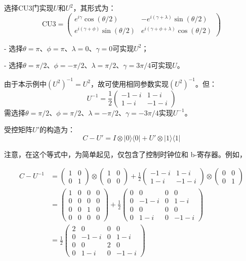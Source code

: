 \documentclass{article}
\begin{document}
选择CU3门实现\(U\)和\(U^2\)，其形式为：
\[
\text{CU3} = \begin{pmatrix} e^{i\gamma}\cos(\theta/2) & -e^{i(\gamma+\lambda)}\sin(\theta/2) \\ e^{i(\gamma+\phi)}\sin(\theta/2) & e^{i(\gamma+\phi+\lambda)}\cos(\theta/2) \end{pmatrix}
\]

- 选择\(\theta = \pi\)、\(\phi = \pi\)、\(\lambda = 0\)、\(\gamma = 0\)可实现\(U^2\)；

- 选择\(\theta = \pi/2\)、\(\phi = -\pi/2\)、\(\lambda = \pi/2\)、\(\gamma = 3\pi/4\)可实现\(U\)。

由于本示例中\({(U^2)}^{-1} = U^2\)，故可使用相同参数实现\({(U^2)}^{-1}\)。但：
\[
U^{-1} = \frac{1}{2} \begin{pmatrix} -1-i & 1-i \\ 1-i & -1-i \end{pmatrix}
\]
需选择\(\theta = \pi/2\)、\(\phi = \pi/2\)、\(\lambda = -\pi/2\)、\(\gamma = -3\pi/4\)实现\(U^{-1}\)。

受控矩阵\(U'\)的构造为：
\[
C-U' = I \otimes |0\rangle\langle0| + U' \otimes |1\rangle\langle1|
\]

注意，在这个等式中，为简单起见，仅包含了控制时钟位和 b-寄存器。例如，

\[
\begin{aligned} 
C - U^{-1} &= \begin{pmatrix} 1 & 0 \\ 0 & 1 \end{pmatrix} \otimes \begin{pmatrix} 1 & 0 \\ 0 & 0 \end{pmatrix} + \frac{1}{2} \begin{pmatrix} -1 - i & 1 - i \\ 1 - i & -1 - i \end{pmatrix} \otimes \begin{pmatrix} 0 & 0 \\ 0 & 1 \end{pmatrix} \\
&= \begin{pmatrix} 1 & 0 & 0 & 0 \\ 0 & 0 & 0 & 0 \\ 0 & 0 & 1 & 0 \\ 0 & 0 & 0 & 0 \end{pmatrix} + \frac{1}{2} \begin{pmatrix} 0 & 0 & 0 & 0 \\ 0 & -1 - i & 0 & 1 - i \\ 0 & 0 & 0 & 0 \\ 0 & 1 - i & 0 & -1 - i \end{pmatrix} \\
&= \frac{1}{2} \begin{pmatrix} 2 & 0 & 0 & 0 \\ 0 & -1 - i & 0 & 1 - i \\ 0 & 0 & 2 & 0 \\ 0 & 1 - i & 0 & -1 - i \end{pmatrix}
\end{aligned}
\]
\end{document}
